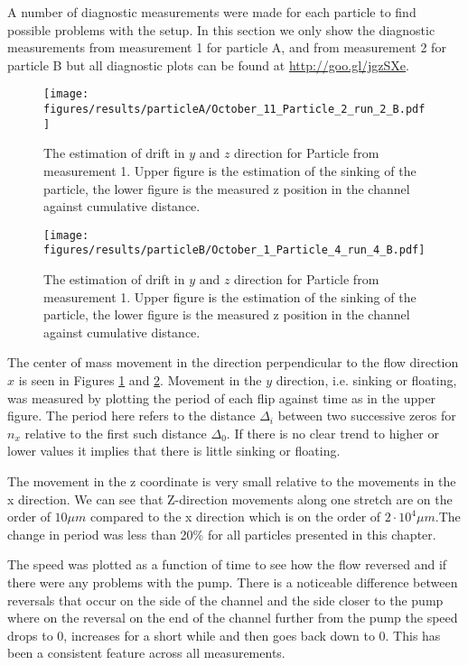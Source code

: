 
A number of diagnostic measurements were made for each particle to find possible problems with the setup. In this section we only show the diagnostic measurements from measurement 1 for particle A, and from measurement 2 for particle B but all diagnostic plots can be found at \url{http://goo.gl/jgzSXe}.


\begin{figure}[H]
\begin{center}
\texttt{[image: figures/results/particleA/October\_11\_Particle\_2\_run\_2\_B.pdf]}
\end{center}
\caption{The estimation of drift in $y$ and $z$ direction for Particle from measurement 1. Upper figure is the estimation of the sinking of the particle, the lower figure is the measured z position in the channel against cumulative distance. }
\label{fig:particleAsink}
\end{figure}

\begin{figure}[H]
\centering
\texttt{[image: figures/results/particleB/October\_1\_Particle\_4\_run\_4\_B.pdf]}	
\caption{The estimation of drift in $y$ and $z$ direction for Particle from measurement 1. Upper figure is the estimation of the sinking of the particle, the lower figure is the measured z position in the channel against cumulative distance.}
\label{fig:particleB2sinking}
\end{figure}



The center of mass movement in the direction perpendicular to the flow direction $x$ is seen in Figures \ref{fig:particleAsink} and \ref{fig:particleB2sinking}. Movement in the $y$ direction, i.e. sinking or floating, was measured by plotting the period of each flip against time as in the upper figure. The period here refers to the distance $\Delta_i$ between two successive zeros for $n_x$ relative to the first such distance $\Delta_0$. If there is no clear trend to higher or lower values it implies that there is little sinking or floating. 

The movement in the z coordinate is very small relative to the movements in the x direction. We can see that Z-direction movements along one stretch are on the order of $10\mu m$ compared to the x direction which is on the order of $2\cdot 10^4 \mu m$.The change in period was less than 20\% for all particles presented in this chapter.

The speed was plotted as a function of time to see how the flow reversed and if there were any problems with the pump. There is a noticeable difference between reversals that occur on the side of the channel and the side closer to the pump where on the reversal on the end of the channel further from the pump the speed drops to 0, increases for a short while and then goes back down to 0. This has been a consistent feature across all measurements.

